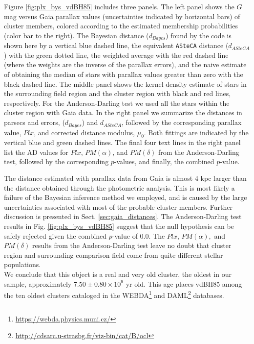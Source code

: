 \documentclass[draft]{aa}
\begin{document}
Figure \ref{fig:plx_bys_vdBH85} includes three panels. The
left panel shows the $G$ mag versus Gaia parallax values (uncertainties indicated by
horizontal bars) of cluster members, colored according to the estimated
membership probabilities (color bar to the right).
%
The Bayesian distance ($d_{Bayes}$) found by the code is shown here by
a vertical blue dashed line, the equivalent \texttt{ASteCA} distance
($d_{ASteCA}$) with the green dotted line, the weighted average with the red dashed
line (where the weights are the inverse of the parallax
errors), and the naive estimate of obtaining the median of stars with
parallax values greater than zero with the black dashed line.
%
The middle panel shows the kernel density estimate of stars in the surrounding
field region and the cluster region with black and red lines, respectively. For
the Anderson-Darling test we used all the stars within the cluster region with
Gaia data. In the right panel we summarize the distances in parsecs and errors,
($d_{Bayes}$) and $d_{ASteCA}$, followed by the corresponding parallax
value, $Plx$, and corrected distance modulus, $\mu_0$. Both fittings are
indicated by the vertical blue and green dashed lines. The final
four text lines in the right panel list the AD values for $Plx$, $PM(\alpha)$, and
$PM(\delta)$ from the Anderson-Darling test, followed by the corresponding
$p$-values, and finally, the combined $p$-value.

The distance estimated with parallax data from Gaia is almost 4 kpc
larger than the distance obtained through the photometric analysis. This is most
likely a failure of the Bayesian inference method we employed, and is caused by the large
uncertainties associated with most of the probable cluster members. Further
discussion is presented in Sect. \ref{sec:gaia_distances}.
%
The Anderson-Darling test results in Fig. \ref{fig:plx_bys_vdBH85} suggest that the
null hypothesis can be safely rejected given the combined $p$-value of
0.0. The $Plx$, $PM(\alpha),$ and $PM(\delta)$ results from the
Anderson-Darling test leave no doubt that cluster region and surrounding comparison field come from quite different stellar populations.\\

We conclude that this object is a real and very old cluster, the oldest in our
sample, approximately $7.50\pm0.80\times10^9$ yr old. This age places
vdBH85 among the ten oldest clusters cataloged in the
WEBDA\footnote{\url{https://webda.physics.muni.cz/}} and
DAML\footnote{\url{http://cdsarc.u-strasbg.fr/viz-bin/cat/B/ocl}}
\citep{Dias_2002} databases.
\end{document}
